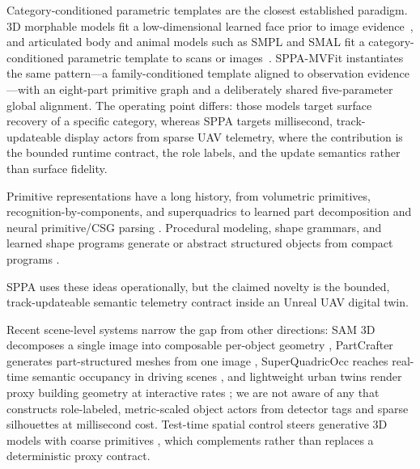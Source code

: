 \documentclass[11pt,a4paper]{article}
\begin{document}
Category-conditioned parametric templates are the closest established paradigm.
3D morphable models fit a low-dimensional learned face prior to image
evidence~\cite{blanz1999morphable}, and articulated body and animal models such
as SMPL and SMAL fit a category-conditioned parametric template to scans or
images~\cite{loper2015smpl,zuffi2017smal}. SPPA-MVFit instantiates the same
pattern---a family-conditioned template aligned to observation evidence---with
an eight-part primitive graph and a deliberately shared five-parameter global
alignment. The operating point differs: those models target surface recovery of
a specific category, whereas SPPA targets millisecond, track-updateable display
actors from sparse UAV telemetry, where the contribution is the bounded runtime
contract, the role labels, and the update semantics rather than surface
fidelity.

{\sloppy
Primitive representations have a long history, from volumetric primitives,
recognition-by-components, and superquadrics to learned part decomposition and
neural primitive/CSG parsing
\cite{biederman1987recognition,solina1990recovery,paschalidou2019superquadrics,tulsiani2017learning,mo2019partnet,sharma2018csgnet,fedele2025superdec}.
Procedural modeling, shape grammars, and learned shape programs generate or
abstract structured objects from compact programs
\cite{mueller2006procedural,jones2020shapeassembly,jones2023shapecoder,khan2024text2cad,rukhovich2024cadrecode}.
\par}
SPPA uses these ideas operationally, but the claimed novelty is the bounded,
track-updateable semantic telemetry contract inside an Unreal UAV digital twin.

Recent scene-level systems narrow the gap from other directions: SAM 3D
decomposes a single image into composable per-object geometry
\cite{chen2026sam3d}, PartCrafter generates part-structured meshes from one
image \cite{lin2025partcrafter}, SuperQuadricOcc reaches real-time semantic
occupancy in driving scenes \cite{hayes2025superquadricocc}, and lightweight
urban twins render proxy building geometry at interactive rates
\cite{liu2025citygo}; we are not aware of any that constructs role-labeled,
metric-scaled object actors from detector tags and sparse silhouettes at
millisecond cost.
Test-time spatial control steers generative 3D models with coarse primitives
\cite{fedele2025spacecontrol}, which complements rather than replaces a
deterministic proxy contract.
\end{document}
